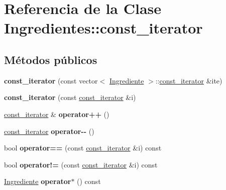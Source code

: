 \hypertarget{classIngredientes_1_1const__iterator}{}\section{Referencia de la Clase Ingredientes\+:\+:const\+\_\+iterator}
\label{classIngredientes_1_1const__iterator}
\subsection*{Métodos públicos}
\begin{DoxyCompactItemize}
\item 
\mbox{\label{classIngredientes_1_1const__iterator_a165aef5163983daf1c8d2066cad514fd}} 
{\bfseries const\+\_\+iterator} (const vector$<$ \hyperlink{classIngrediente}{Ingrediente} $>$\+::\hyperlink{classIngredientes_1_1const__iterator}{const\+\_\+iterator} \&ite)
\item 
\mbox{\label{classIngredientes_1_1const__iterator_a7ff7834df091decd6243e152a0b18fdc}} 
{\bfseries const\+\_\+iterator} (const \hyperlink{classIngredientes_1_1const__iterator}{const\+\_\+iterator} \&i)
\item 
\mbox{\label{classIngredientes_1_1const__iterator_a65ceda30adc427d6f29359ea5bc194de}} 
\hyperlink{classIngredientes_1_1const__iterator}{const\+\_\+iterator} \& {\bfseries operator++} ()
\item 
\mbox{\label{classIngredientes_1_1const__iterator_a7c7e0c3c91779309074345886739847b}} 
\hyperlink{classIngredientes_1_1const__iterator}{const\+\_\+iterator} {\bfseries operator-\/-\/} ()
\item 
\mbox{\label{classIngredientes_1_1const__iterator_adc549ffc966900cfabdc87e02e0ee02b}} 
bool {\bfseries operator==} (const \hyperlink{classIngredientes_1_1const__iterator}{const\+\_\+iterator} \&i) const
\item 
\mbox{\label{classIngredientes_1_1const__iterator_a4894a635351685d4f541a20b7da9af09}} 
bool {\bfseries operator!=} (const \hyperlink{classIngredientes_1_1const__iterator}{const\+\_\+iterator} \&i) const
\item 
\mbox{\label{classIngredientes_1_1const__iterator_ae21a62d62f5a35095b1c2b8c1306a1e8}} 
\hyperlink{classIngrediente}{Ingrediente} {\bfseries operator$\ast$} () const
\end{DoxyCompactItemize}
